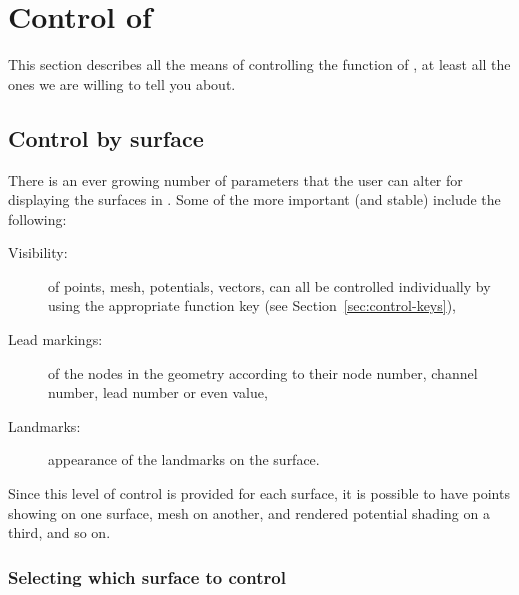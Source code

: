 \newpage
\section{Control of \map{}}
\label{sec:control}

This section describes all the means of controlling the function of \map{},
at least all the ones we are willing to tell you about.



\subsection{Control by surface}

There is an ever growing number of parameters that the user can alter
for displaying the surfaces in \map{}.  Some of the more important (and
stable) include the following:

\begin{description}
  \item [Visibility:] of points, mesh, potentials, vectors, \etc{} can all
        be controlled individually by using the appropriate function key
        (see Section~\ref{sec:control-keys}), 
      \item [Lead markings: ] of the nodes in the geometry according to
        their node number, channel number, lead number or even value,
  \item [Landmarks: ] appearance of the landmarks on the surface.
\end{description}

Since this level of control is provided for each surface, it is possible to
have points showing on one surface, mesh on another, and rendered potential
shading on a third, and so on. 

\subsubsection{Selecting which surface to control} 
\label{sec:locks} 

